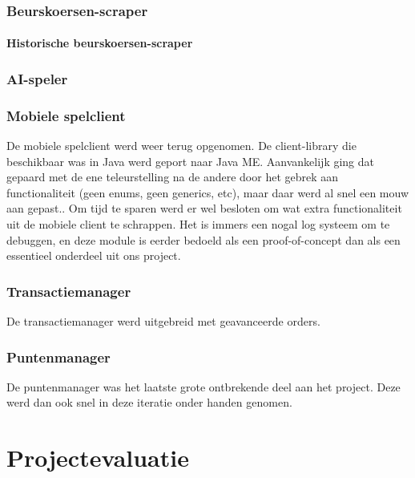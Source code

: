 \subsubsection{Beurskoersen-scraper}
\paragraph{Historische beurskoersen-scraper}

\subsubsection{AI-speler}

\subsubsection{Mobiele spelclient}
De mobiele spelclient werd weer terug opgenomen. De client-library die beschikbaar was in Java werd geport naar Java ME. Aanvankelijk ging dat gepaard met de ene teleurstelling na de andere door het gebrek aan functionaliteit (geen enums, geen generics, etc), maar daar werd al snel een mouw aan gepast.. Om tijd  te sparen werd er wel besloten om wat extra functionaliteit uit de mobiele client te schrappen. Het is immers een nogal log systeem om te debuggen, en deze module is eerder bedoeld als een proof-of-concept dan als een essentieel onderdeel uit ons project.

\subsubsection{Transactiemanager}
De transactiemanager werd uitgebreid met geavanceerde orders.

\subsubsection{Puntenmanager}
De puntenmanager was het laatste grote ontbrekende deel aan het project. Deze werd dan ook snel in deze iteratie onder handen genomen.


\section{Projectevaluatie}
